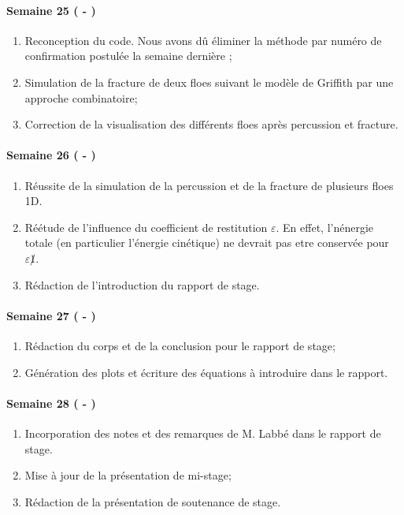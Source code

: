 \paragraph{Semaine 25 ( - )} 
\begin{enumerate}
    \item Reconception du code. Nous avons dû éliminer la méthode par numéro de confirmation postulée la semaine dernière ;
    \item Simulation de la fracture de deux floes suivant le modèle de Griffith par une approche combinatoire;
    \item Correction de la visualisation des différents floes après percussion et fracture.
\end{enumerate}
  
\paragraph{Semaine 26 ( - )} 
\begin{enumerate}
    \item Réussite de la simulation de la percussion et de la fracture de plusieurs floes 1D.
    \item Réétude de l'influence du coefficient de restitution $\varepsilon$. En effet, l'nénergie totale (en particulier l'énergie cinétique) ne devrait pas etre conservée pour $\varepsilon \not 1$.
    \item Rédaction de l'introduction du rapport de stage.
\end{enumerate}
  
\paragraph{Semaine 27 ( - )} 
\begin{enumerate}
    \item Rédaction du corps et de la conclusion pour le rapport de stage;
    \item Génération des plots et écriture des équations à introduire dans le rapport. 
\end{enumerate}

\paragraph{Semaine 28 ( - )} 
\begin{enumerate}
    \item Incorporation des notes et des remarques de M. Labbé dans le rapport de stage.
    \item Mise à jour de la présentation de mi-stage;
    \item Rédaction de la présentation de soutenance de stage.
\end{enumerate}



